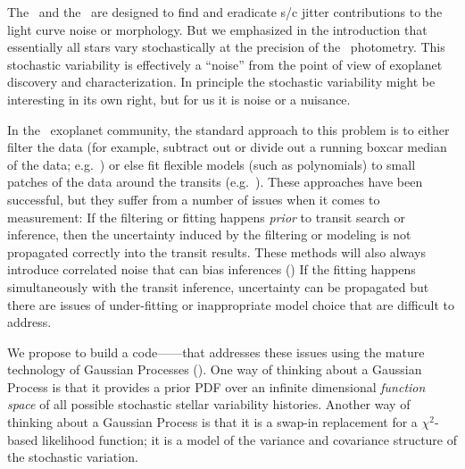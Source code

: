 \documentclass[letterpaper,12pt,preprint]{hack_aastex}
\begin{document}
The \PLM\ and the \OWL\ are designed to find and eradicate s/c jitter
contributions to the light curve noise or morphology.
But we emphasized in the introduction that essentially all stars vary
stochastically at the precision of the \Kepler\ photometry.
This stochastic variability is effectively a ``noise'' from the point of view
of exoplanet discovery and characterization.
In principle the stochastic variability might be interesting in its own right,
but for us it is noise or a nuisance.

In the \Kepler\ exoplanet community, the standard approach to this problem is
to either filter the data (for example, subtract out or divide out a running
boxcar median of the data; e.g.~\citealt{dressing})
or else fit flexible models (such as polynomials)
to small patches of the data around the transits (e.g.~\citealt{carter}).
These approaches have been successful, but they suffer from a number
of issues when it comes to measurement:
If the filtering or fitting happens \emph{prior} to transit search or inference,
then the uncertainty induced by the filtering or modeling is not propagated
correctly into the transit results.
These methods will also always introduce correlated noise that can bias
inferences (\citealt{cw})
If the fitting happens simultaneously with the transit inference, uncertainty
can be propagated but there are issues of under-fitting or inappropriate model
choice that are difficult to address.

We propose to build a code---\George---that addresses these issues using the
mature technology of Gaussian Processes
(\citealt{rw, gibson-gp, evans, arc}).
One way of thinking about a Gaussian Process is that it provides a prior PDF
over an infinite dimensional \emph{function space} of all possible stochastic
stellar variability histories.
Another way of thinking about a Gaussian Process is that it is a swap-in
replacement for a $\chi^2$-based likelihood function;
it is a model of the variance and covariance structure of the stochastic
variation.
\end{document}
